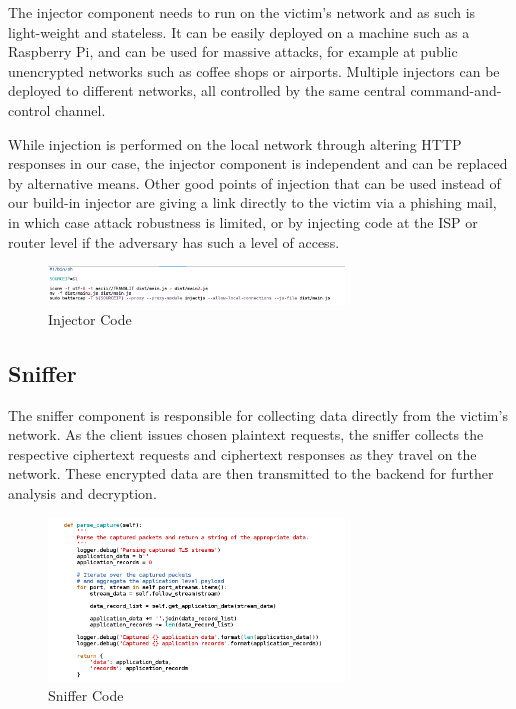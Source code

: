 The injector component needs to run on the victim's network and as such is
light-weight and stateless. It can be easily deployed on a machine such as a
Raspberry Pi, and can be used for massive attacks, for example at public
unencrypted networks such as coffee shops or airports. Multiple injectors can
be deployed to different networks, all controlled by the same central
command-and-control channel.

While injection is performed on the local network through altering HTTP
responses in our case, the injector component is independent and can be
replaced by alternative means. Other good points of injection that can be used
instead of our build-in injector are giving a link directly to the victim via a
phishing mail, in which case attack robustness is limited, or by injecting code
at the ISP or router level if the adversary has such a level of access.


\begin{figure}[H] \caption{Injector Code} \centering
\includegraphics[width=0.7\textwidth]{diagrams/injector.png}\end{figure}


\subsection{Sniffer}

The sniffer component is responsible for collecting data directly from the
victim's network. As the client issues chosen plaintext requests, the sniffer
collects the respective ciphertext requests and ciphertext responses as they
travel on the network. These encrypted data are then transmitted to the backend
for further analysis and decryption.

\begin{figure}[H] \caption{Sniffer Code} \centering
\includegraphics[width=0.7\textwidth]{diagrams/sniffer.png}\end{figure}

